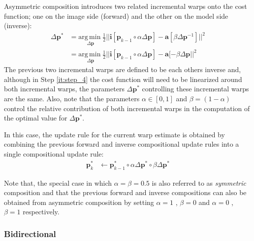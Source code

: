 Asymmetric composition introduces two related incremental warps onto the cost function; one on the image side (forward) and the other on the model side (inverse): 
\begin{equation}
    \begin{aligned}
        \Delta \mathbf{p}^* & = \underset{\Delta \mathbf{p}} {\mathrm{arg\, min\;}} \frac{1}{2}|| \mathbf{i}[\mathbf{p}_{k-1} \circ \alpha \Delta \mathbf{p}] - \mathbf{a} [\beta \Delta \mathbf{p}^{-1}] ||^2
        \\
        & = \underset{\Delta \mathbf{p}} {\mathrm{arg\, min\;}} \frac{1}{2}|| \mathbf{i}[\mathbf{p}_{k-1} \circ \alpha \Delta \mathbf{p}] - \mathbf{a} [-\beta \Delta \mathbf{p} ||^2
    \label{eq:ssd_ac}
    \end{aligned}
\end{equation}
The previous two incremental warps are defined to be each others inverse and, although in Step \ref{it:step_4} the cost function will need to be linearized around both incremental warps, the parameters $\Delta \mathbf{p}^* $ controlling these incremental warps are the same. Also, note that the parameters $\alpha \in [0, 1]$ and $\beta=(1-\alpha)$ control the relative contribution of both incremental warps in the computation of the optimal value for $\Delta \mathbf{p}^*$. 

In this case, the update rule for the current warp estimate is obtained by combining the previous forward and inverse compositional update rules into a single compositional update rule:
\begin{equation}
 	\begin{aligned}
    	\mathbf{p}_k^* & \leftarrow \mathbf{p}_{k-1}^* \circ \alpha \Delta \mathbf{p}^* \circ \beta \Delta \mathbf{p}^* 
    \label{eq:ac_update}
    \end{aligned}
\end{equation}

Note that, the special case in which $\alpha = \beta = 0.5$ is also referred to as \emph{symmetric} composition \cite{Megret2008, Autheserre2009, Megret2010} and that the previous forward and inverse compositions can also be obtained from asymmetric composition by setting $\alpha = 1$ , $\beta = 0$ and $\alpha = 0$ , $\beta = 1$ respectively.

\subsubsection{Bidirectional}
\label{sec:bidirectional}


